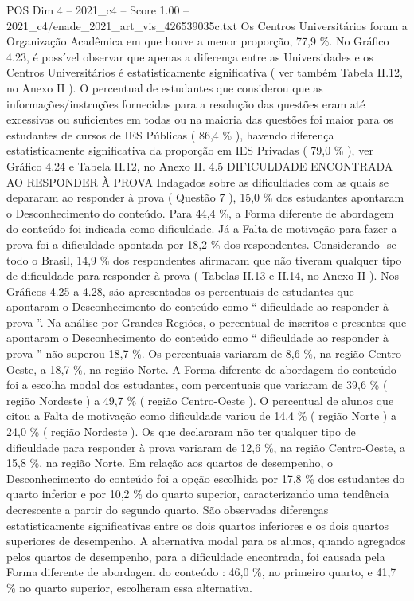 \begin{textsample}{POS Dim 4 – 2021\_c4 – Score 1.00 – 2021\_c4/enade\_2021\_art\_vis\_426539035c.txt}
Os Centros Universitários foram a Organização Acadêmica em que houve a menor proporção, 77,9 \%.
No Gráfico 4.23, é possível observar que apenas a diferença entre as Universidades e os Centros Universitários é estatisticamente significativa ( ver também Tabela II.12, no Anexo II ).
O percentual de estudantes que considerou que as informações/instruções fornecidas para a resolução das questões eram até excessivas ou suficientes em todas ou na maioria das questões foi maior para os estudantes de cursos de IES Públicas ( 86,4 \% ), havendo diferença estatisticamente significativa da proporção em IES Privadas ( 79,0 \% ), ver Gráfico 4.24 e Tabela II.12, no Anexo II. 4.5 DIFICULDADE ENCONTRADA AO RESPONDER À PROVA Indagados sobre as dificuldades com as quais se depararam ao responder à prova ( Questão 7 ), 15,0 \% dos estudantes apontaram o Desconhecimento do conteúdo.
Para 44,4 \%, a Forma diferente de abordagem do conteúdo foi indicada como dificuldade.
Já a Falta de motivação para fazer a prova foi a dificuldade apontada por 18,2 \% dos respondentes.
Considerando -se todo o Brasil, 14,9 \% dos respondentes afirmaram que não tiveram qualquer tipo de dificuldade para responder à prova ( Tabelas II.13 e II.14, no Anexo II ).
Nos Gráficos 4.25 a 4.28, são apresentados os percentuais de estudantes que apontaram o Desconhecimento do conteúdo como “ dificuldade ao responder à prova ”.
Na análise por Grandes Regiões, o percentual de inscritos e presentes que apontaram o Desconhecimento do conteúdo como “ dificuldade ao responder à prova ” não superou 18,7 \%.
Os percentuais variaram de 8,6 \%, na região Centro-Oeste, a 18,7 \%, na região Norte.
A Forma diferente de abordagem do conteúdo foi a escolha modal dos estudantes, com percentuais que variaram de 39,6 \% ( região Nordeste ) a 49,7 \% ( região Centro-Oeste ).
O percentual de alunos que citou a Falta de motivação como dificuldade variou de 14,4 \% ( região Norte ) a 24,0 \% ( região Nordeste ).
Os que declararam não ter qualquer tipo de dificuldade para responder à prova variaram de 12,6 \%, na região Centro-Oeste, a 15,8 \%, na região Norte.
Em relação aos quartos de desempenho, o Desconhecimento do conteúdo foi a opção escolhida por 17,8 \% dos estudantes do quarto inferior e por 10,2 \% do quarto superior, caracterizando uma tendência decrescente a partir do segundo quarto.
São observadas diferenças estatisticamente significativas entre os dois quartos inferiores e os dois quartos superiores de desempenho.
A alternativa modal para os alunos, quando agregados pelos quartos de desempenho, para a dificuldade encontrada, foi causada pela Forma diferente de abordagem do conteúdo : 46,0 \%, no primeiro quarto, e 41,7 \% no quarto superior, escolheram essa alternativa.

\end{textsample}
